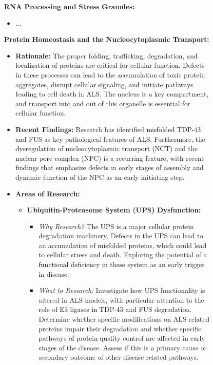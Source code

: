 \begin{figure}[htbp!]
\begin{tcolorbox}[
    colback=black!5!white,
    colframe=black!60!white,
    title=\textbf{Example of a research overview by the Meta-review agent (continued)},
    fonttitle=\bfseries,
    arc=3mm,
    boxrule=1pt,
    bottomrule=2pt,
]
\footnotesize
\textbf{RNA Processing and Stress Granules:}
\begin{itemize}
    \item ...
\end{itemize}

\textbf{Protein Homeostasis and the Nucleocytoplasmic Transport:}
\begin{itemize}
    \item \textbf{Rationale:} The proper folding, trafficking, degradation, and localization of proteins are critical for cellular function. Defects in these processes can lead to the accumulation of toxic protein aggregates, disrupt cellular signaling, and initiate pathways leading to cell death in ALS. The nucleus is a key compartment, and transport into and out of this organelle is essential for cellular function.
    \item \textbf{Recent Findings:} Research has identified misfolded TDP-43 and FUS as key pathological features of ALS. Furthermore, the dysregulation of nucleocytoplasmic transport (NCT) and the nuclear pore complex (NPC) is a recurring feature, with recent findings that emphasize defects in early stages of assembly and dynamic function of the NPC as an early initiating step.
    \item \textbf{Areas of Research:}
    \begin{itemize}
        \item \textbf{Ubiquitin-Proteasome System (UPS) Dysfunction:}
        \begin{itemize}
            \item \textit{Why Research?} The UPS is a major cellular protein degradation machinery. Defects in the UPS can lead to an accumulation of misfolded proteins, which could lead to cellular stress and death. Exploring the potential of a functional deficiency in these system as an early trigger in disease.
            \item \textit{What to Research:} Investigate how UPS functionality is altered in ALS models, with particular attention to the role of E3 ligases in TDP-43 and FUS degradation. Determine whether specific modifications on ALS related proteins impair their degradation and whether specific pathways of protein quality control are affected in early stages of the disease. Assess if this is a primary cause or secondary outcome of other disease related pathways.

\end{itemize}
\end{itemize}
\end{itemize}
\end{tcolorbox}
\end{figure}

